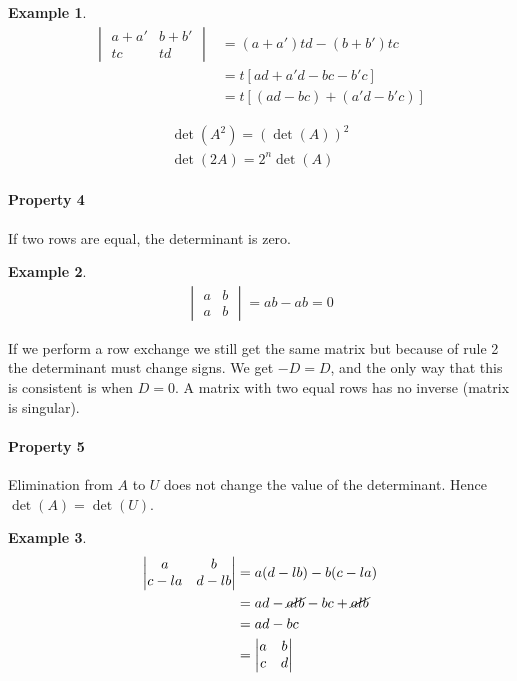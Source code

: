 \documentclass[12pt, letterpaper]{article}
\newcommand{\DefinitionSpace}{\vspace{15px}}
\theoremstyle{definition}
\newtheorem{example}{Example}
\begin{document}
	\begin{example}
		\begin{align*}
			\begin{vmatrix}
				a+a' & b+b' \\
				tc & td		
			\end{vmatrix} &= (a + a')td - (b + b')tc \\
			              &= t\left[ ad + a'd - bc - b'c \right] \\
			              &=  t\left[ (ad- bc)  + (a'd - b'c )\right]
		\end{align*}
	\end{example}

	\begin{gather*}
		\det(A^2) = (\det(A))^2 \\
		\det(2A) = 2^n \det(A)
		\end{gather*}

\DefinitionSpace
\paragraph{Property 4}
If two rows are equal, the determinant is zero.
	\begin{example}
		\begin{gather*}
			\begin{vmatrix}
				a & b \\
				a & b 
			\end{vmatrix} = ab - ab = 0
		\end{gather*}
	\end{example}

	If we perform a row exchange we still get the same matrix but because of rule 2 the determinant must change signs. We get $-D = D$, and the only way that this is consistent is when $D = 0$. A matrix with two equal rows has no inverse (matrix is singular). 
	
	
\DefinitionSpace
\paragraph{Property 5}
Elimination from $A$ to $U$ does not change the value of the determinant. Hence $\det(A) = \det(U)$.

	\begin{example}
		\begin{align*}
			\begin{vmatrix}
				a & b\\
				c - la & d - lb
			\end{vmatrix} &= a(d - lb) - b(c - la) \\
						  &= ad - \cancel{alb} - bc + \cancel{alb} \\
						  &= ad - bc \\
						  &= \begin{vmatrix}
						  			a & b\\
						  			c & d
						     \end{vmatrix}
		\end{align*}
	\end{example}
\end{document}
